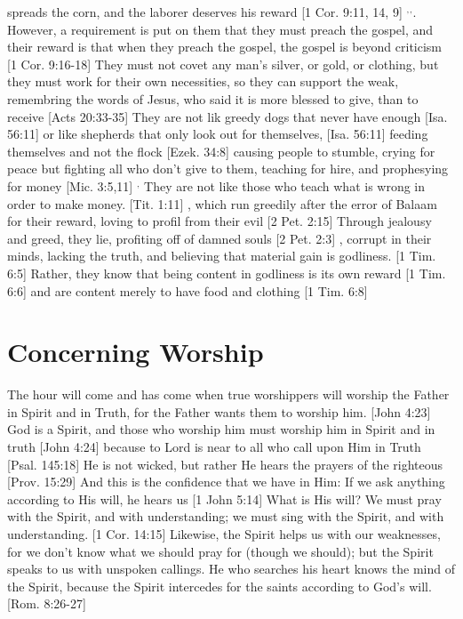 \documentclass[../main.tex] {subfiles}
\begin{document}
spreads the corn, and the laborer deserves his reward [1 Cor. 9:11, 14, 9] $^{,}$$^{,}$. However, a requirement is put on them that they must preach the gospel, and their reward is that when they preach the gospel, the gospel is beyond criticism [1 Cor. 9:16-18]  They must not covet any man's silver, or gold, or clothing, but they must work for their own necessities, so they can support the weak, remembring the words of Jesus, who said it is more blessed to give, than to receive [Acts 20:33-35]  They are not lik greedy dogs that never have enough [Isa. 56:11]  or like shepherds that only look out for themselves, [Isa. 56:11]  feeding themselves and not the flock [Ezek. 34:8]  causing people to stumble, crying for peace but fighting all who don't give to them, teaching for hire, and prophesying for money [Mic. 3:5,11] $^{,}$ They are not like those who teach what is wrong in order to make money. [Tit. 1:11] , which run greedily after the error of Balaam for their reward, loving to profil from their evil [2 Pet. 2:15]  Through jealousy and greed, they lie, profiting off of damned souls [2 Pet. 2:3] , corrupt in their minds, lacking the truth, and believing that material gain is godliness. [1 Tim. 6:5]  Rather, they know that being content in godliness is its own reward [1 Tim. 6:6]  and are content merely to have food and clothing [1 Tim. 6:8] 

	\section{Concerning Worship}

	The hour will come and has come when true worshippers will worship the Father in Spirit and in Truth, for the Father wants them to worship him. [John 4:23]  God is a Spirit, and those who worship him must worship him in Spirit and in truth [John 4:24]  because to Lord is near to all who call upon Him in Truth [Psal. 145:18]  He is not wicked, but rather He hears the prayers of the righteous [Prov. 15:29]  And this is the confidence that we have in Him: If we ask anything according to His will, he hears us [1 John 5:14]  What is His will?  We must pray with the Spirit, and with understanding; we must sing with the Spirit, and with understanding. [1 Cor. 14:15]  Likewise, the Spirit helps us with our weaknesses, for we don't know what we should pray for (though we should); but the Spirit speaks to us with unspoken callings. He who searches his heart knows the mind of the Spirit, because the Spirit intercedes for the saints according to God's will. [Rom. 8:26-27] 
\end{document}
